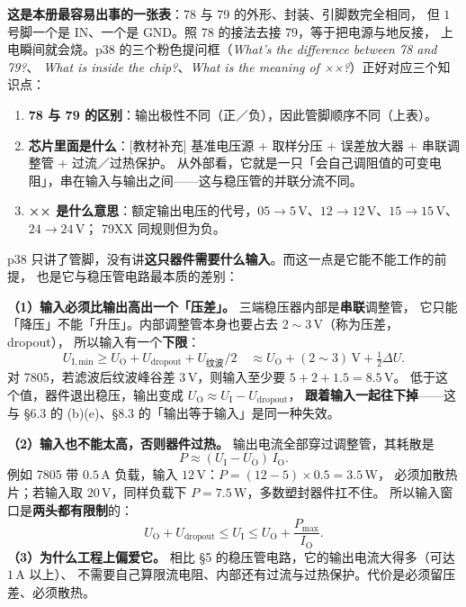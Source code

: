 \documentclass[11pt]{ctexart}
\renewcommand{\subhdr}[1]{%
  \par\vspace{6pt}%
  \noindent{\color{violet}\bfseries #1}\par\nopagebreak[4]\vspace{1pt}}
\begin{document}
\textbf{这是本册最容易出事的一张表}：78 与 79 的外形、封装、引脚数完全相同，
但 $1$ 号脚一个是 IN、一个是 GND。照 78 的接法去接 79，等于把电源与地反接，
上电瞬间就会烧。p38 的三个粉色提问框（\emph{What's the difference between 78 and 79?}、
\emph{What is inside the chip?}、\emph{What is the meaning of ××?}）正好对应三个知识点：

\begin{enumerate}
\item \textbf{78 与 79 的区别}：输出极性不同（正／负），因此管脚顺序不同（上表）。
\item \textbf{芯片里面是什么}：[教材补充] 基准电压源 + 取样分压 + 误差放大器 + 串联调整管 + 过流／过热保护。
从外部看，它就是一只「会自己调阻值的可变电阻」，串在输入与输出之间——这与稳压管的并联分流不同。
\item \textbf{×× 是什么意思}：额定输出电压的代号，$05\to5\,\mathrm{V}$、$12\to12\,\mathrm{V}$、$15\to15\,\mathrm{V}$、$24\to24\,\mathrm{V}$；
79XX 同规则但为负。
\end{enumerate}

\subhdr{8.6 压差与输入窗口（[教材补充]）}

p38 只讲了管脚，没有讲\textbf{这只器件需要什么输入}。而这一点是它能不能工作的前提，
也是它与稳压管电路最本质的差别：

\textbf{（1）输入必须比输出高出一个「压差」。} 三端稳压器内部是\textbf{串联}调整管，
它只能「降压」不能「升压」。内部调整管本身也要占去 $2\sim3\,\mathrm{V}$（称为压差，dropout），
所以输入有一个\textbf{下限}：
\[
U_{\mathrm{I,min}}\ge U_{\mathrm{O}}+U_{\mathrm{dropout}}+U_{\text{纹波}}/2
\quad\approx U_{\mathrm{O}}+(2\sim3)\,\mathrm{V}+\tfrac12\Delta U .
\]
对 7805，若滤波后纹波峰谷差 $3\,\mathrm{V}$，则输入至少要 $5+2+1.5=8.5\,\mathrm{V}$。
低于这个值，器件退出稳压，输出变成 $U_{\mathrm{O}}\approx U_{\mathrm{I}}-U_{\mathrm{dropout}}$，
\textbf{跟着输入一起往下掉}——这与 §6.3 的 (b)(e)、§8.3 的「输出等于输入」是同一种失效。

\textbf{（2）输入也不能太高，否则器件过热。} 输出电流全部穿过调整管，其耗散是
\[
P\approx(U_{\mathrm{I}}-U_{\mathrm{O}})\,I_{\mathrm{O}} .
\]
例如 7805 带 $0.5\,\mathrm{A}$ 负载，输入 $12\,\mathrm{V}$：$P=(12-5)\times0.5=3.5\,\mathrm{W}$，
必须加散热片；若输入取 $20\,\mathrm{V}$，同样负载下 $P=7.5\,\mathrm{W}$，多数塑封器件扛不住。
所以输入窗口是\textbf{两头都有限制}的：
\[
U_{\mathrm{O}}+U_{\mathrm{dropout}}\le U_{\mathrm{I}}\le U_{\mathrm{O}}+\frac{P_{\max}}{I_{\mathrm{O}}} .
\]
\textbf{（3）为什么工程上偏爱它。} 相比 §5 的稳压管电路，它的输出电流大得多（可达 $1\,\mathrm{A}$ 以上）、
不需要自己算限流电阻、内部还有过流与过热保护。代价是必须留压差、必须散热。
\end{document}
